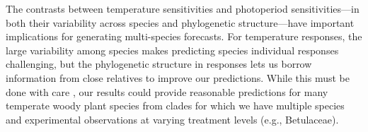 \documentclass[11pt]{article}
\begin{document}

The contrasts between temperature sensitivities and photoperiod sensitivities---in both their variability across species and phylogenetic structure---have important implications for generating multi-species forecasts. For temperature responses, the large variability among species makes predicting species individual responses challenging, but the phylogenetic structure in responses lets us borrow information from close relatives to improve our predictions. While this must be done with care \citep{molina2018assessing}, our results could provide reasonable predictions for many temperate woody plant species from clades for which we have multiple species and experimental observations at varying treatment levels (e.g., Betulaceae). 
\end{document}
